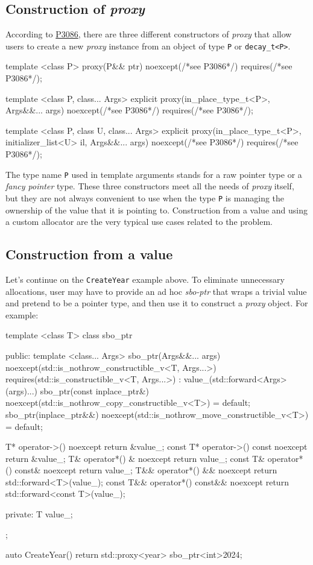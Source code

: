 \documentclass[10pt, a4paper, oneside]{article}
\begin{document}
\subsection{Construction of \textit{proxy}}
According to \href{https://wg21.link/p3086}{P3086},
there are three different constructors of \textit{proxy} that allow users to create a new \textit{proxy} instance from an object of type \verb|P| or \verb|decay_t<P>|.
\begin{codeblock}
template <class P>
proxy(P&& ptr) noexcept(/*see P3086*/) requires(/*see P3086*/);

template <class P, class... Args>
explicit proxy(in_place_type_t<P>, Args&&... args)
  noexcept(/*see P3086*/) requires(/*see P3086*/);

template <class P, class U, class... Args>
explicit proxy(in_place_type_t<P>, initializer_list<U> il,
  Args&&... args)
  noexcept(/*see P3086*/) requires(/*see P3086*/);
\end{codeblock}
The type name \verb|P| used in template arguments stands for a raw pointer type or a \textit{fancy pointer} type.
These three constructors meet all the needs of \textit{proxy} itself,
but they are not always convenient to use when the type \verb|P| is managing the ownership of the value that it is pointing to.
Construction from a value and using a custom allocator are the very typical use cases related to the problem.

\subsection{Construction from a value}
Let's continue on the \verb|CreateYear| example above.
To eliminate unnecessary allocations, user may have to provide an ad hoc \textit{sbo-ptr} that wraps a trivial value and pretend to be a pointer type,
and then use it to construct a \textit{proxy} object.
For example:
\begin{codeblock}
template <class T>
class sbo_ptr {
 public:
  template <class... Args>
  sbo_ptr(Args&&... args)
      noexcept(std::is_nothrow_constructible_v<T, Args...>)
      requires(std::is_constructible_v<T, Args...>)
      : value_(std::forward<Args>(args)...) {}
  sbo_ptr(const inplace_ptr&)
      noexcept(std::is_nothrow_copy_constructible_v<T>) = default;
  sbo_ptr(inplace_ptr&&)
      noexcept(std::is_nothrow_move_constructible_v<T>) = default;

  T* operator->() noexcept { return &value_; }
  const T* operator->() const noexcept { return &value_; }
  T& operator*() & noexcept { return value_; }
  const T& operator*() const& noexcept { return value_; }
  T&& operator*() && noexcept { return std::forward<T>(value_); }
  const T&& operator*() const&& noexcept
      { return std::forward<const T>(value_); }

 private:
  T value_;
};

auto CreateYear() {
  return std::proxy<year>{
    sbo_ptr<int>{2024}};
}
\end{codeblock}
\end{document}
